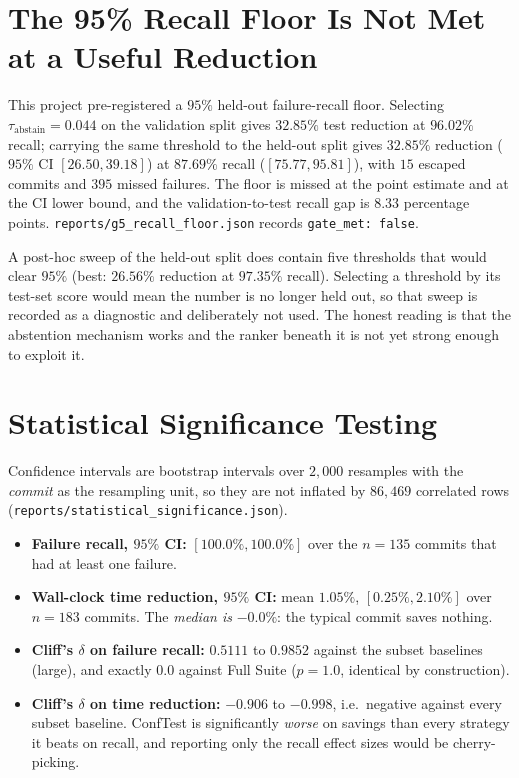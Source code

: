 \section{The 95\% Recall Floor Is Not Met at a Useful Reduction}
This project pre-registered a $95\%$ held-out failure-recall floor. Selecting
$\tau_{\text{abstain}} = 0.044$ on the validation split gives $32.85\%$ test reduction at $96.02\%$
recall; carrying the same threshold to the held-out split gives $32.85\%$ reduction
($95\%$ CI $[26.50, 39.18]$) at $87.69\%$ recall ($[75.77, 95.81]$), with $15$ escaped commits and $395$
missed failures. The floor is missed at the point estimate and at the CI lower bound, and the
validation-to-test recall gap is $8.33$ percentage points. \texttt{reports/g5\_recall\_floor.json}
records \texttt{gate\_met: false}.

A post-hoc sweep of the held-out split does contain five thresholds that would clear $95\%$ (best:
$26.56\%$ reduction at $97.35\%$ recall). Selecting a threshold by its test-set score would mean the
number is no longer held out, so that sweep is recorded as a diagnostic and deliberately not used. The
honest reading is that the abstention mechanism works and the ranker beneath it is not yet strong enough
to exploit it.

\section{Statistical Significance Testing}
Confidence intervals are bootstrap intervals over $2{,}000$ resamples with the \emph{commit} as the
resampling unit, so they are not inflated by $86{,}469$ correlated rows
(\texttt{reports/statistical\_significance.json}).

\begin{itemize}
    \item \textbf{Failure recall, $95\%$ CI:} $[100.0\%, 100.0\%]$ over the $n = 135$ commits that had at
          least one failure.
    \item \textbf{Wall-clock time reduction, $95\%$ CI:} mean $1.05\%$, $[0.25\%, 2.10\%]$ over
          $n = 183$ commits. The \emph{median is} $-0.0\%$: the typical commit saves nothing.
    \item \textbf{Cliff's $\delta$ on failure recall:} $0.5111$ to $0.9852$ against the subset baselines
          (large), and exactly $0.0$ against Full Suite ($p = 1.0$, identical by construction).
    \item \textbf{Cliff's $\delta$ on time reduction:} $-0.906$ to $-0.998$, i.e.\ negative against every
          subset baseline. ConfTest is significantly \emph{worse} on savings than every strategy it beats
          on recall, and reporting only the recall effect sizes would be cherry-picking.
\end{itemize}

